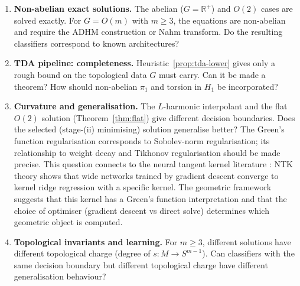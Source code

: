 \documentclass[11pt, a4paper]{article}
\theoremstyle{plain}
\theoremstyle{definition}
\begin{document}
\begin{enumerate}[label=\textbf{Q\arabic*.}, leftmargin=*, itemsep=6pt]

\item \textbf{Non-abelian exact solutions.}
The abelian ($G = \mathbb{R}^+$) and $O(2)$ cases are solved exactly. For $G = O(m)$
with $m \geq 3$, the equations are non-abelian and require the ADHM construction
\cite{atiyah1978} or Nahm transform. Do the resulting classifiers correspond to known architectures?

\item \textbf{TDA pipeline: completeness.}
Heuristic~\ref{prop:tda-lower} gives only a rough bound on the topological data
$G$ must carry. Can it be made a theorem? How should non-abelian $\pi_1$ and torsion
in $H_1$ be incorporated?

\item \textbf{Curvature and generalisation.}
The $L$-harmonic interpolant and the flat $O(2)$ solution (Theorem~\ref{thm:flat})
give different decision boundaries. Does the selected (stage-(ii) minimising)
solution generalise better? The Green's function regularisation corresponds to
Sobolev-norm regularisation; its relationship to weight decay and Tikhonov
regularisation should be made precise. This question connects to the neural
tangent kernel literature \cite{jacot2018ntk}: NTK theory shows that wide
networks trained by gradient descent converge to kernel ridge regression with
a specific kernel. The geometric framework suggests that this kernel has a
Green's function interpretation and that the choice of optimiser (gradient
descent vs direct solve) determines which geometric object is computed.

\item \textbf{Topological invariants and learning.}
For $m \geq 3$, different solutions have different topological charge (degree of
$s: M \to S^{m-1}$). Can classifiers with the same decision boundary but
different topological charge have different generalisation behaviour?


\end{enumerate}
\end{document}
